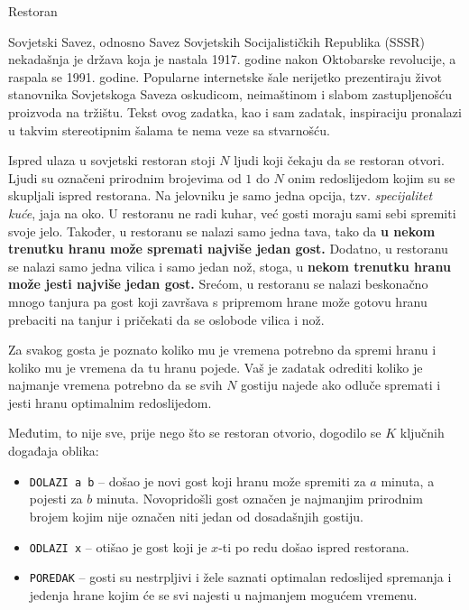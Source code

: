 \begin{statement}[
  problempoints=100,
  timelimit=1 sekunda,
  memorylimit=512 MiB,
]{Restoran}

Sovjetski Savez, odnosno Savez Sovjetskih Socijalističkih Republika (SSSR)
nekadašnja je država koja je nastala 1917. godine nakon Oktobarske revolucije,
a raspala se 1991. godine. Popularne internetske šale nerijetko prezentiraju
život stanovnika Sovjetskoga Saveza oskudicom, neimaštinom i slabom
zastupljenošću proizvoda na tržištu. Tekst ovog zadatka, kao i sam zadatak,
inspiraciju pronalazi u takvim stereotipnim šalama te nema veze sa stvarnošću.

Ispred ulaza u sovjetski restoran stoji $N$ ljudi koji čekaju da se restoran
otvori. Ljudi su označeni prirodnim brojevima od $1$ do $N$ onim redoslijedom
kojim su se skupljali ispred restorana. Na jelovniku je samo jedna opcija,
tzv. \textit{specijalitet kuće}, jaja na oko. U restoranu ne radi kuhar, već
gosti moraju sami sebi spremiti svoje jelo. Također, u restoranu se nalazi
samo jedna tava, tako da \textbf{u nekom trenutku hranu može spremati najviše
jedan gost.} Dodatno, u restoranu se nalazi samo jedna vilica i samo jedan
nož, stoga, u \textbf{nekom trenutku hranu može jesti najviše jedan gost.}
Srećom, u restoranu se nalazi beskonačno mnogo tanjura pa gost koji završava
s pripremom hrane može gotovu hranu prebaciti na tanjur i pričekati da se
oslobode vilica i nož.

Za svakog gosta je poznato koliko mu je vremena potrebno da spremi hranu
i koliko mu je vremena da tu hranu pojede. Vaš je zadatak odrediti koliko
je najmanje vremena potrebno da se svih $N$ gostiju najede ako odluče spremati
i jesti hranu optimalnim redoslijedom.

Međutim, to nije sve, prije nego što se restoran otvorio, dogodilo se $K$
ključnih događaja oblika:

\begin{itemize}
  \item \texttt{DOLAZI a b} -- došao je novi gost koji hranu može spremiti za
        $a$ minuta, a pojesti za $b$ minuta. Novopridošli gost označen je
        najmanjim prirodnim brojem kojim nije označen niti jedan od dosadašnjih
        gostiju.
  \item \texttt{ODLAZI x} -- otišao je gost koji je $x$-ti po redu došao ispred
        restorana.
  \item \texttt{POREDAK} -- gosti su nestrpljivi i žele saznati optimalan redoslijed
        spremanja i jedenja hrane kojim će se svi najesti u najmanjem mogućem vremenu.
\end{itemize}


\end{statement}
